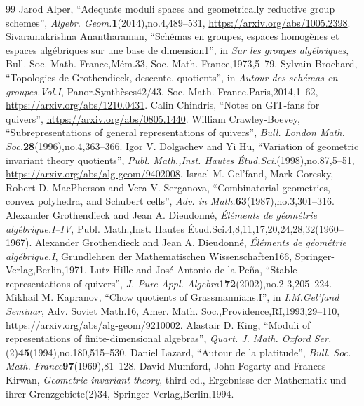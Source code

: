 \documentclass[10pt,a4paper]{amsart}
\theoremstyle{definition}
\begin{document}
\begin{thebibliography}{99}
 Jarod Alper, ``Adequate moduli spaces and geometrically reductive group schemes'', \emph{Algebr. Geom.}\textbf{1}(2014),no.4,489--531, \url{https://arxiv.org/abs/1005.2398}.
 Sivaramakrishna Anantharaman, ``Schémas en groupes, espaces homogènes et espaces algébriques sur une base de dimension1'', in \emph{Sur les groupes algébriques}, Bull. Soc. Math. France,Mém.33, Soc. Math. France,1973,5--79.
 Sylvain Brochard, ``Topologies de Grothendieck, descente, quotients'', in \emph{Autour des schémas en groupes.Vol.I}, Panor.Synthèses42/43, Soc. Math. France,Paris,2014,1--62, \url{https://arxiv.org/abs/1210.0431}.
 Calin Chindris, ``Notes on GIT-fans for quivers'', \url{https://arxiv.org/abs/0805.1440}.
 William Crawley-Boevey, ``Subrepresentations of general representations of quivers'', \emph{Bull. London Math. Soc.}\textbf{28}(1996),no.4,363--366.
 Igor V. Dolgachev and Yi Hu, ``Variation of geometric invariant theory quotients'', \emph{Publ. Math.,Inst. Hautes Étud.Sci.}(1998),no.87,5--51, \url{https://arxiv.org/abs/alg-geom/9402008}.
 Israel M. Gel'fand, Mark Goresky, Robert D. MacPherson and Vera V. Serganova, ``Combinatorial geometries, convex polyhedra, and Schubert cells'', \emph{Adv. in Math.}\textbf{63}(1987),no.3,301--316.
 Alexander Grothendieck and Jean A. Dieudonné, \emph{Éléments de géométrie algébrique.I--IV}, Publ. Math.,Inst. Hautes Étud.Sci.4,8,11,17,20,24,28,32(1960--1967).
 Alexander Grothendieck and Jean A. Dieudonné, \emph{Éléments de géométrie algébrique.I}, Grundlehren der Mathematischen Wissenschaften166, Springer-Verlag,Berlin,1971.
 Lutz Hille and José Antonio de la Peña, ``Stable representations of quivers'', \emph{J. Pure Appl. Algebra}\textbf{172}(2002),no.2-3,205--224.
 Mikhail M. Kapranov, ``Chow quotients of Grassmannians.I'', in \emph{I.M.Gel'fand Seminar}, Adv. Soviet Math.16, Amer. Math. Soc.,Providence,RI,1993,29--110, \url{https://arxiv.org/abs/alg-geom/9210002}.
 Alastair D. King, ``Moduli of representations of finite-dimensional algebras'', \emph{Quart. J. Math. Oxford Ser.}(2)\textbf{45}(1994),no.180,515--530.
 Daniel Lazard, ``Autour de la platitude'', \emph{Bull. Soc. Math. France}\textbf{97}(1969),81--128.
 David Mumford, John Fogarty and Frances Kirwan, \emph{Geometric invariant theory}, third ed., Ergebnisse der Mathematik und ihrer Grenzgebiete(2)34, Springer-Verlag,Berlin,1994.

\end{thebibliography}
\end{document}
